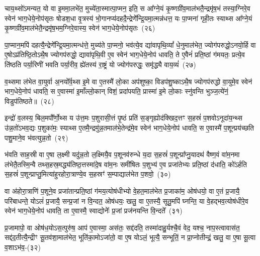 चाय॒थ्सो॑\-ऽमन्यत॒ यो वा इ॒ममा॒लभे॑त॒ मुच्ये॑ता॒स्मात्पा॒\-प्मन॒ इति॒ स आ᳚ग्ने॒यं कृ॒ष्णग्री॑व॒माल॑भतै॒न्द्रमृ॑ष॒भं तस्या॒ग्निरे॒व स्वेन॑ भाग॒धेये॒नोप॑सृतः षोडश॒धा वृ॒त्रस्य॑ भो॒गानप्य॑दह\-दै॒न्द्रेणे᳚न्द्रि॒य\-मा॒त्मन्न॑धत्त॒ यः पा॒प्मना॑ गृही॒तः स्याथ्स आ᳚ग्ने॒यं कृ॒ष्णग्री॑व॒माल॑भेतै॒न्द्रमृ॑ष॒भम॒ग्निरे॒वास्य॒ स्वेन॑ भाग॒धेये॒नोप॑सृतः~(२६)

पा॒प्मान॒मपि॑ दहत्यै॒न्द्रेणे᳚न्द्रि॒यमा॒त्मन्ध॑त्ते॒ मुच्य॑ते पा॒प्मनो॒ भव॑त्ये॒व द्या॑वापृथि॒व्यां᳚ धे॒नुमा\-ल॑भेत॒ ज्योग॑परुद्धो॒\-ऽनयो॒र्\mbox{}हि वा ए॒षो\-ऽप्र॑तिष्ठि॒तो\-ऽथै॒ष ज्योगप॑रुद्धो॒ द्यावा॑पृथि॒वी ए॒व स्वेन॑ भाग॒धेये॒नोप॑ धावति॒ ते ए॒वैनं॑ प्रति॒ष्ठां ग॑मयतः॒ प्रत्ये॒व ति॑ष्ठति पर्या॒रिणी॑ भवति पर्या॒रीव॒ ह्ये॑तस्य॑ रा॒ष्ट्रं यो ज्योग॑परुद्धः॒ समृ॑द्ध्यै वाय॒व्यं॑~(२७)

व॒थ्समा ल॑भेत वा॒युर्वा अ॒नयो᳚र्व॒थ्स इ॒मे वा ए॒तस्मै॑ लो॒का अप॑शुष्का॒ विडप॑शु॒ष्का\-ऽथै॒ष ज्योगप॑रुद्धो वा॒युमे॒व स्वेन॑ भाग॒धेये॒नोप॑ धावति॒ स ए॒वास्मा॑ इ॒माँल्लो॒कान् विशं॒ प्रदा॑पयति॒ प्रास्मा॑ इ॒मे लो॒काः स्नु॑वन्ति भुञ्ज॒त्ये॑नं॒ विडुप॑तिष्ठते॥~(२८)

{\anuvakamend[{म॒ध्यन्दि॑ने॒ कद्रुं॑ य॒मस्य॒ स्पर्ध॑मानो वैष्णावरु॒णीन्तमिन्द्रो᳚\-ऽस्य॒ स्वेन॑ भाग॒धेये॒नोप॑सृतो वाय॒व्यं॑ द्विच॑त्वारिꣳशच्च।~(४)।}]}

इन्द्रो॑ व॒लस्य॒ बिल॒मपौ᳚र्णो॒थ्स य उ॑त्त॒मः प॒शुरासी॒त्तं पृ॒ष्ठं प्रति॑ स॒ङ्गृह्योद॑क्खिद॒त्तꣳ स॒हस्रं॑ प॒शवो\-ऽनूदा॑य॒न्थ्स उ॑न्न॒तो॑\-ऽभव॒द्यः प॒शुका॑मः॒ स्याथ्स ए॒तमै॒न्द्रमु॑न्न॒तमाल॑भे॒तेन्द्र॑मे॒व स्वेन॑ भाग॒धेये॒नोप॑ धावति॒ स ए॒वास्मै॑ प॒शून्प्रय॑च्छति पशु॒माने॒व भ॑वत्युन्न॒तो~(२९)

भ॑वति साह॒स्री वा ए॒षा ल॒क्ष्मी यदु॑न्न॒तो ल॒क्ष्मियै॒व प॒शूनव॑\-रुन्धे य॒दा स॒हस्रं॑ प॒शून्प्रा᳚प्नु॒यादथ॑ वैष्ण॒वं वा॑म॒नमा ल॑भेतै॒तस्मि॒न्वै तथ्स॒हस्र॒मद्ध्य॑तिष्ठ॒त्तस्मा॑दे॒ष वा॑म॒नः समी॑षितः प॒शुभ्य॑ ए॒व प्रजा॑तेभ्यः प्रति॒ष्ठां द॑धाति॒ को॑\-ऽर्\mbox{}हति स॒हस्रं॑ प॒शून्प्राप्तु॒मित्या॑हुरहोरा॒त्राण्ये॒व स॒हस्रꣳ॑ स॒म्पाद्याल॑भेत प॒शवो॒~(३०)

वा अ॑होरा॒त्राणि॑ प॒शूने॒व प्रजा॑तान्प्रति॒ष्ठां ग॑मय॒त्योष॑धीभ्यो वे॒हत॒माल॑भेत प्र॒जाका॑म॒ ओष॑धयो॒ वा ए॒तं प्र॒जायै॒ परि॑बाधन्ते॒ यो\-ऽलं॑ प्र॒जायै॒ सन्प्र॒जां न वि॒न्दत॒ ओष॑धयः॒ खलु॒ वा ए॒तस्यै॒ सूतु॒मपि॑ घ्नन्ति॒ या वे॒हद्भव॒त्योष॑धीरे॒व स्वेन॑ भाग॒धेये॒नोप॑ धावति॒ ता ए॒वास्मै॒ स्वाद्योनेः᳚ प्र॒जां प्रज॑नयन्ति वि॒न्दते᳚~(३१)

प्र॒जामापो॒ वा ओष॑ध॒यो\-ऽस॒त्पुरु॑ष॒ आप॑ ए॒वास्मा॒ अस॑तः॒ सद्द॑दति॒ तस्मा॑दाहु॒र्यश्चै॒वं वेद॒ यश्च॒ नाप॒स्त्वावास॑त॒ सद्द॑द॒तीत्यै॒न्द्रीꣳ सू॒तव॑शा॒मा\-ल॑भेत॒ भूति॑का॒मो\-ऽजा॑तो॒ वा ए॒ष यो\-ऽलं॒ भूत्यै॒ सन्भूतिं॒ न प्रा॒प्नोतीन्द्रं॒ खलु॒ वा ए॒षा सू॒त्वा व॒शा\-ऽभ॑व॒-(३२)

